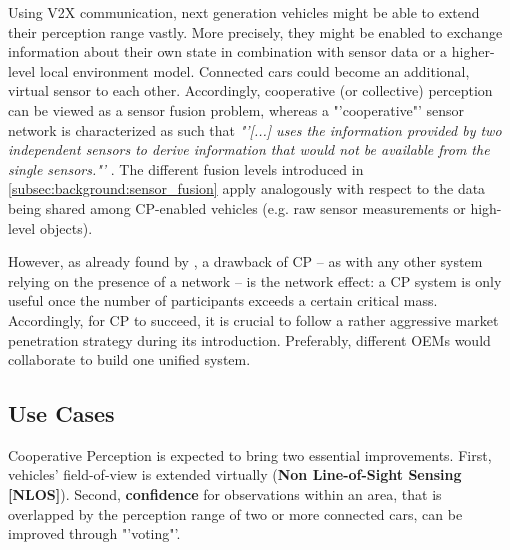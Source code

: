 Using V2X communication, next generation vehicles might be able to extend their perception range vastly. More precisely, they might be enabled to exchange information about their own state in combination with sensor data or a higher-level local environment model. Connected cars could become an additional, virtual sensor to each other. Accordingly, cooperative (or collective) perception can be viewed as a sensor fusion problem, whereas a "'cooperative"' sensor network is characterized as such that \textit{"'[...] uses the information provided by two independent sensors to derive information that would not be available from the single sensors."'} \cite{Elmenreich2002}. The different fusion levels introduced in \autoref{subsec:background:sensor_fusion} apply analogously with respect to the data being shared among CP-enabled vehicles (e.g. raw sensor measurements or high-level objects).

However, as already found by \cite{Gunther2015}, a drawback of CP – as with any other system relying on the presence of a network – is the network effect: a CP system is only useful once the number of participants exceeds a certain critical mass. Accordingly, for CP to succeed, it is crucial to follow a rather aggressive market penetration strategy during its introduction. Preferably, different OEMs would collaborate to build one unified system.

\subsection{Use Cases}
\label{subsec:background:use_cases}
Cooperative Perception is expected to bring two essential improvements. First, vehicles' field-of-view is extended virtually (\textbf{Non Line-of-Sight Sensing [NLOS]}). Second, \textbf{confidence} for observations within an area, that is overlapped by the perception range of two or more connected cars, can be improved through "'voting"'.

